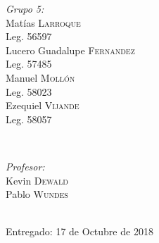 \begin{titlepage}
    \begin{minipage}{0.4\textwidth}
    \begin{flushleft} \large
    \emph{Grupo 5:}\\		%
    [.3cm]
    Matías \textsc{Larroque}\\
    Leg. 56597\\ 
    [.3cm]
    Lucero Guadalupe \textsc{Fernandez}\\
    Leg. 57485\\ 
    [.3cm]
    Manuel \textsc{Mollón}\\
    Leg. 58023\\ 
    [.3cm]
    Ezequiel \textsc{Vijande}\\
    Leg. 58057\\ 
    [.3cm]
    \end{flushleft}
    \end{minipage}
    ~
    \begin{minipage}{0.4\textwidth}
    \begin{flushright} \large
    \emph{Profesor:} \\
    [.3cm]
    Kevin \textsc{Dewald}\\ %
    Pablo \textsc{Wundes}\\
    \end{flushright}
    \end{minipage}\\[2cm]
        
        
        
    \vfill
    {\large Entregado: 17 de Octubre de 2018}\\[2cm] %
        
        
         
        
        
    \end{titlepage}
